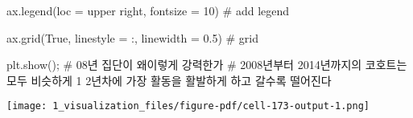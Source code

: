 \documentclass[
  letterpaper,
  DIV=11,
  numbers=noendperiod]{scrartcl}
\newenvironment{Shaded}{\begin{snugshade}}{\end{snugshade}}
\newcommand{\CommentTok}[1]{\textcolor[rgb]{0.37,0.37,0.37}{#1}}
\newcommand{\DecValTok}[1]{\textcolor[rgb]{0.68,0.00,0.00}{#1}}
\newcommand{\FloatTok}[1]{\textcolor[rgb]{0.68,0.00,0.00}{#1}}
\newcommand{\NormalTok}[1]{\textcolor[rgb]{0.00,0.23,0.31}{#1}}
\newcommand{\OperatorTok}[1]{\textcolor[rgb]{0.37,0.37,0.37}{#1}}
\newcommand{\StringTok}[1]{\textcolor[rgb]{0.13,0.47,0.30}{#1}}
\newcommand{\VariableTok}[1]{\textcolor[rgb]{0.07,0.07,0.07}{#1}}
\begin{document}
\begin{Shaded}
\begin{Highlighting}[]
\NormalTok{ax.legend(loc }\OperatorTok{=} \StringTok{\textquotesingle{}upper right\textquotesingle{}}\NormalTok{, fontsize }\OperatorTok{=} \DecValTok{10}\NormalTok{) }\CommentTok{\# add legend}

\NormalTok{ax.grid(}\VariableTok{True}\NormalTok{, linestyle }\OperatorTok{=} \StringTok{\textquotesingle{}:\textquotesingle{}}\NormalTok{, linewidth }\OperatorTok{=} \FloatTok{0.5}\NormalTok{) }\CommentTok{\# grid}

\NormalTok{plt.show()}\OperatorTok{;}
\CommentTok{\# 08년 집단이 왜이렇게 강력한가 }
\CommentTok{\# 2008년부터 2014년까지의 코호트는 모두 비슷하게 1 2년차에 가장 활동을 활발하게 하고 갈수록 떨어진다}
\end{Highlighting}
\end{Shaded}

\texttt{[image: 1\_visualization\_files/figure-pdf/cell-173-output-1.png]}
\end{document}
